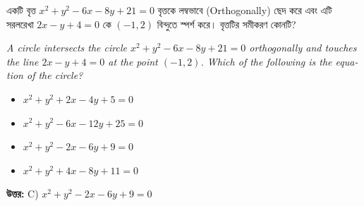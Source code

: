 \documentclass[12pt, a4paper]{article}
\begin{document}
\begin{tcolorbox}[questionbox={প্রশ্ন (Question) 30}]
    \noindent
    একটি বৃত্ত $x^2 + y^2 - 6x - 8y + 21 = 0$ বৃত্তকে লম্বভাবে (Orthogonally) ছেদ করে এবং এটি সরলরেখা $2x - y + 4 = 0$ কে $(-1, 2)$ বিন্দুতে স্পর্শ করে। বৃত্তটির সমীকরণ কোনটি?
    
    \vspace{0.8em}
    \begin{english}
    \noindent\textit{\color{darkgray}
    A circle intersects the circle $x^2 + y^2 - 6x - 8y + 21 = 0$ orthogonally and touches the line $2x - y + 4 = 0$ at the point $(-1, 2)$. Which of the following is the equation of the circle?
    }
    \end{english}
\end{tcolorbox}

\vspace{1em}
\begin{itemize}[label={}, leftmargin=1cm, itemsep=0.5em]
    \item[\textbf{A)}] $x^2 + y^2 + 2x - 4y + 5 = 0$
    \item[\textbf{B)}] $x^2 + y^2 - 6x - 12y + 25 = 0$
    \item[\textbf{C)}] $x^2 + y^2 - 2x - 6y + 9 = 0$
    \item[\textbf{D)}] $x^2 + y^2 + 4x - 8y + 11 = 0$
\end{itemize}

\vspace{0.5em}
\begin{tcolorbox}[answerbox]
    \textbf{\color{success} উত্তর:} C) $x^2 + y^2 - 2x - 6y + 9 = 0$
\end{tcolorbox}
\vspace{1em}
\end{document}
